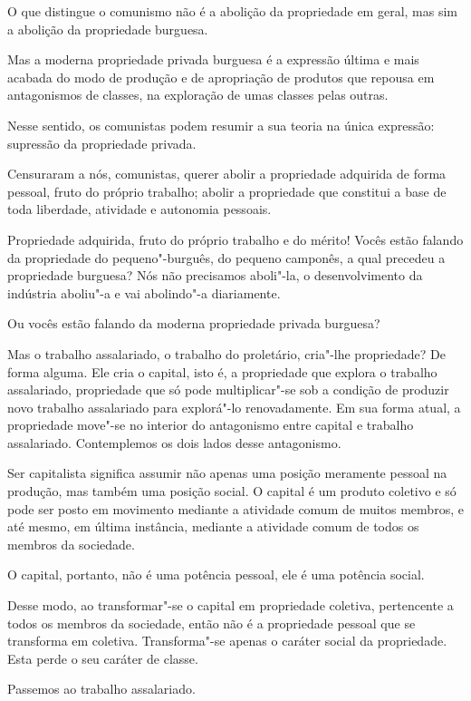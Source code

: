 O que distingue o comunismo não é a abolição da propriedade em geral,
mas sim a abolição da propriedade burguesa.

Mas a moderna propriedade privada burguesa é a expressão última e mais
acabada do modo de produção e de apropriação de produtos que repousa em
antagonismos de classes, na exploração de umas classes pelas outras.

Nesse sentido, os comunistas podem resumir a sua teoria na única
expressão: supressão da propriedade privada.

Censuraram a nós, comunistas, querer abolir a propriedade adquirida de
forma pessoal, fruto do próprio trabalho; abolir a propriedade que
constitui a base de toda liberdade, atividade e autonomia pessoais.

Propriedade adquirida, fruto do próprio trabalho e do mérito! Vocês
estão falando da propriedade do pequeno"-burguês, do pequeno camponês,
a qual precedeu a propriedade burguesa? Nós não precisamos aboli"-la,
o desenvolvimento da indústria aboliu"-a e vai abolindo"-a
diariamente.

Ou vocês estão falando da moderna propriedade privada burguesa?

Mas o trabalho assalariado, o trabalho do proletário, cria"-lhe
propriedade? De forma alguma. Ele cria o capital, isto é, a propriedade
que explora o trabalho assalariado, propriedade que só pode
multiplicar"-se sob a condição de produzir novo trabalho assalariado
para explorá"-lo renovadamente. Em sua forma atual, a propriedade
move"-se no interior do antagonismo entre capital e trabalho
assalariado. Contemplemos os dois lados desse antagonismo.

Ser capitalista significa assumir não apenas uma posição meramente
pessoal na produção, mas também uma posição social. O capital é um
produto coletivo e só pode ser posto em movimento mediante a atividade
comum de muitos membros, e até mesmo, em última instância, mediante a
atividade comum de todos os membros da sociedade.

O capital, portanto, não é uma potência pessoal, ele é uma potência
social.

Desse modo, ao transformar"-se o capital em propriedade coletiva,
pertencente a todos os membros da sociedade, então não é a propriedade
pessoal que se transforma em coletiva. Transforma"-se apenas o caráter
social da propriedade. Esta perde o seu caráter de classe.

Passemos ao trabalho assalariado.

